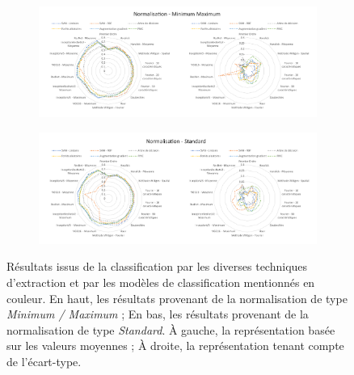 \begin{figure}[H]
    \centering
    
    \begin{subfigure}{\textwidth}
      \includegraphics[width=\textwidth]{contents/chapter_5/resources/results_image_classification_mms.pdf}
    \end{subfigure}
    
    \begin{subfigure}{\textwidth}
      \includegraphics[width=\textwidth]{contents/chapter_5/resources/results_image_classification_ss.pdf}
    \end{subfigure}
    
    \caption{Résultats issus de la classification par les diverses techniques d'extraction et par les modèles de classification mentionnés en couleur. En haut, les résultats provenant de la normalisation de type \textit{Minimum / Maximum} ; En bas, les résultats provenant de la normalisation de type \textit{Standard}. À gauche, la représentation basée sur les valeurs moyennes ; À droite, la représentation tenant compte de l'écart-type.}
    \label{fig:results_image_classification}
\end{figure}\par


